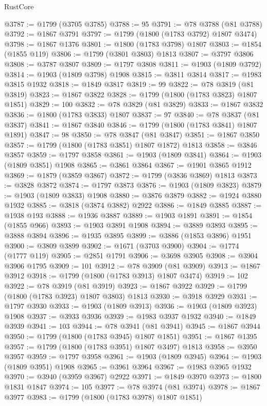 \begin{lexlean}{RustCore}
\begin{coremodule}
@3787 := @1799 (@3705 @3785)
@3788 := 95
@3791 := @78 @3788 (@81 @3788)
@3792 := @1867 @3791
@3797 := @1799 (@1800 (@1783 @3792) @1807 @3474)
@3798 := @1867 @1376
@3801 := @1800 (@1783 @3798) @1807
@3803 := @1854 (@1855 @119)
@3806 := @1799 (@3801 @3803) @1813
@3807 := @3797 @3806
@3808 := @3787 @3807
@3809 := @1797 @3808
@3811 := @1903 (@1809 @3792)
@3814 := @1903 (@1809 @3798) @1908
@3815 := @3811 @3814
@3817 := @1983 @3815 @1932
@3818 := @1849 @3817
@3819 := 99
@3822 := @78 @3819 (@81 @3819)
@3823 := @1867 @3822
@3828 := @1799 (@1800 (@1783 @3823) @1807 @1851)
@3829 := 100
@3832 := @78 @3829 (@81 @3829)
@3833 := @1867 @3832
@3836 := @1800 (@1783 @3833) @1807
@3837 := 97
@3840 := @78 @3837 (@81 @3837)
@3841 := @1867 @3840
@3846 := @1799 (@1800 (@1783 @3841) @1807 @1891)
@3847 := 98
@3850 := @78 @3847 (@81 @3847)
@3851 := @1867 @3850
@3857 := @1799 (@1800 (@1783 @3851) @1807 @1872) @1813
@3858 := @3846 @3857
@3859 := @1797 @3858
@3861 := @1903 (@1809 @3841)
@3864 := @1903 (@1809 @3851) @1908
@3865 := @3861 @3864
@3867 := @1901 @3865 @1912
@3869 := @1879 (@3859 @3867)
@3872 := @1799 (@3836 @3869) @1813
@3873 := @3828 @3872
@3874 := @1797 @3873
@3876 := @1903 (@1809 @3823)
@3879 := @1903 (@1809 @3833) @1908
@3880 := @3876 @3879
@3882 := @1924 @3880 @1932
@3885 := @3818 (@3874 @3882) @2922
@3886 := @1849 @3885
@3887 := @1938 @193
@3888 := @1936 @3887
@3889 := @1903 @1891
@3891 := @1854 (@1855 @966)
@3893 := @1903 @3891 @1908
@3894 := @3889 @3893
@3895 := @3888 @3894
@3896 := @1935 @3895
@3899 := @3886 (@1853 @3896) @1951
@3900 := @3809 @3899
@3902 := @1671 (@3703 @3900)
@3904 := @1774 (@1777 @119)
@3905 := @2851 @1791
@3906 := @3698 @3905
@3908 := @3904 @3906 @1795
@3909 := 101
@3912 := @78 @3909 (@81 @3909)
@3913 := @1867 @3912
@3918 := @1799 (@1800 (@1783 @3913) @1807 @3474)
@3919 := 102
@3922 := @78 @3919 (@81 @3919)
@3923 := @1867 @3922
@3929 := @1799 (@1800 (@1783 @3923) @1807 @3803) @1813
@3930 := @3918 @3929
@3931 := @1797 @3930
@3933 := @1903 (@1809 @3913)
@3936 := @1903 (@1809 @3923) @1908
@3937 := @3933 @3936
@3939 := @1983 @3937 @1932
@3940 := @1849 @3939
@3941 := 103
@3944 := @78 @3941 (@81 @3941)
@3945 := @1867 @3944
@3950 := @1799 (@1800 (@1783 @3945) @1807 @1851)
@3951 := @1867 @1395
@3957 := @1799 (@1800 (@1783 @3951) @1807 @3497) @1813
@3958 := @3950 @3957
@3959 := @1797 @3958
@3961 := @1903 (@1809 @3945)
@3964 := @1903 (@1809 @3951) @1908
@3965 := @3961 @3964
@3967 := @1983 @3965 @1932
@3970 := @3940 (@3959 @3967) @2922
@3971 := @1849 @3970
@3973 := @1800 @1831 @1847
@3974 := 105
@3977 := @78 @3974 (@81 @3974)
@3978 := @1867 @3977
@3983 := @1799 (@1800 (@1783 @3978) @1807 @1851)

\end{coremodule}
\end{lexlean}
